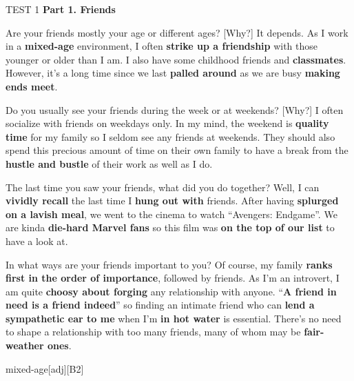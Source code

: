 \begin{glossarymc}[Cambridge 4]
    \begin{test}{TEST 1}
    \noindent
    \textbf{Part 1. Friends}
	
	\begin{qa}{Are your friends mostly your age or different ages? [Why?]}
	It depends. As I work in a \textbf{mixed-age} environment, I often \textbf{strike up a friendship} with those younger or older than I am. I also have some childhood friends and \textbf{classmates}. However, it's a long time since we last \textbf{palled around} as we are busy \textbf{making ends meet}.
	\end{qa}

	\begin{qa}{Do you usually see your friends during the week or at weekends? [Why?]}
	I often socialize with friends on weekdays only. In my mind, the weekend is \textbf{quality time} for my family so I seldom see any friends at weekends. They should also spend this precious amount of time on their own family to have a break from the \textbf{hustle and bustle} of their work as well as I do.
	\end{qa}

	\begin{qa}{The last time you saw your friends, what did you do together?}
	Well, I can \textbf{vividly recall} the last time I \textbf{hung out with} friends. After having \textbf{splurged on a lavish meal}, we went to the cinema to watch ``Avengers: Endgame''. We are kinda \textbf{die-hard Marvel fans} so this film was \textbf{on the top of our list} to have a look at.
	\end{qa}

	\begin{qa}{In what ways are your friends important to you?}
	Of course, my family \textbf{ranks first in the order of importance}, followed by friends. As I'm an introvert, I am quite \textbf{choosy about forging} any relationship with anyone. ``\textbf{A friend in need is a friend indeed}'' so finding an intimate friend who can \textbf{lend a sympathetic ear to me} when I'm \textbf{in hot water} is essential. There's no need to shape a relationship with too many friends, many of whom may be \textbf{fair-weather ones}.
	\end{qa}

	
        \begin{VocabExplain}[Part 1]
			\begin{ExplainCard}{mixed-age}[adj][B2]
			\end{ExplainCard}


\end{VocabExplain}
\end{test}
\end{glossarymc}
